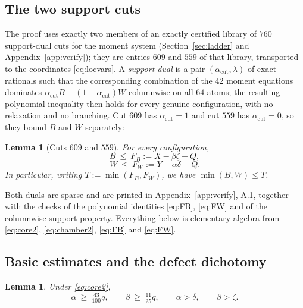 \documentclass[11pt]{amsart}
\newtheorem{lemma}[theorem]{Lemma}
\theoremstyle{definition}
\theoremstyle{remark}
\begin{document}
\subsection{The two support cuts}

The proof uses exactly two members of an exactly certified library of $760$ support-dual cuts for the moment system (Section~\ref{sec:ladder} and Appendix~\ref{app:verify}); they are entries $609$ and $559$ of that library, transported to the coordinates \eqref{eq:locvars}. A \emph{support dual} is a pair $(\alpha_{\mathrm{cut}},\lambda)$ of exact rationals such that the corresponding combination of the $42$ moment equations dominates $\alpha_{\mathrm{cut}}B+(1-\alpha_{\mathrm{cut}})W$ columnwise on all $64$ atoms; the resulting polynomial inequality then holds for every genuine configuration, with no relaxation and no branching. Cut $609$ has $\alpha_{\mathrm{cut}}=1$ and cut $559$ has $\alpha_{\mathrm{cut}}=0$, so they bound $B$ and $W$ separately:

\begin{lemma}[Cuts $609$ and $559$]\label{lem:cuts}
For every configuration,
\begin{equation}\label{eq:FB}
B\ \le\ F_B:=X-\beta\zeta+Q,
\end{equation}
\begin{equation}\label{eq:FW}
W\ \le\ F_W:=Y-\alpha\delta+Q .
\end{equation}
In particular, writing $T:=\min(F_B,F_W)$, we have $\min(B,W)\le T$.
\end{lemma}

Both duals are sparse and are printed in Appendix~\ref{app:verify}, A.1, together with the checks of the polynomial identities \eqref{eq:FB}, \eqref{eq:FW} and of the columnwise support property. Everything below is elementary algebra from \eqref{eq:core2}, \eqref{eq:chamber2}, \eqref{eq:FB} and \eqref{eq:FW}.

\subsection{Basic estimates and the defect dichotomy}

\begin{lemma}\label{lem:basic}
Under \eqref{eq:core2},
\begin{equation}\label{eq:albe}
\alpha\ \ge\ \tfrac{43}{100}q,\qquad \beta\ \ge\ \tfrac{11}{25}q,\qquad \alpha>\delta,\qquad\beta>\zeta .
\end{equation}
\end{lemma}
\end{document}
